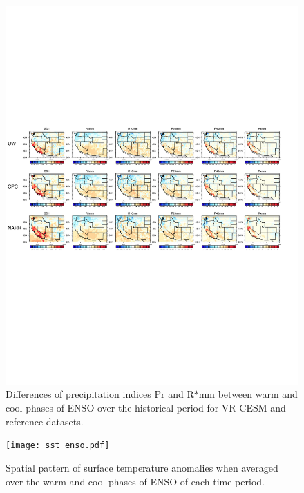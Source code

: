 \documentclass{ametsoc}
\begin{document}
\begin{figure}
\begin{center}
\includegraphics[width=6in]{wd_index_enso_ref_wetSeason.pdf}
\caption{Differences of precipitation indices Pr and R$\ast$mm between warm and cool phases of ENSO over the historical period for VR-CESM and reference datasets.}
\end{center}
\label{fig:S4}
\end{figure}

\begin{figure}
\begin{center}
\texttt{[image: sst\_enso.pdf]}
\caption{Spatial pattern of surface temperature anomalies when averaged over the warm and cool phases of ENSO of each time period.}
\end{center}
\label{fig:S5}
\end{figure}
\end{document}
